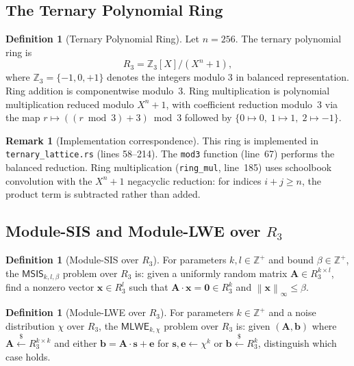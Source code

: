 \documentclass[11pt,a4paper]{article}
\theoremstyle{definition}
\newtheorem{definition}[theorem]{Definition}
\newtheorem{remark}[theorem]{Remark}
\newcommand{\Z}{\mathbb{Z}}
\newcommand{\linf}[1]{\left\lVert #1 \right\rVert_{\infty}}
\newcommand{\MSIS}{\textsf{MSIS}}
\newcommand{\MLWE}{\textsf{MLWE}}
\begin{document}
\subsection{The Ternary Polynomial Ring}

\begin{definition}[Ternary Polynomial Ring]
\label{def:ring}
Let $n = 256$. The ternary polynomial ring is
\[
  R_3 = \Z_3[X] / (X^n + 1),
\]
where $\Z_3 = \{-1, 0, +1\}$ denotes the integers modulo 3 in balanced representation. Ring addition is componentwise modulo~3. Ring multiplication is polynomial multiplication reduced modulo $X^n + 1$, with coefficient reduction modulo~3 via the map $r \mapsto ((r \bmod 3) + 3) \bmod 3$ followed by $\{0 \mapsto 0,\; 1 \mapsto 1,\; 2 \mapsto -1\}$.
\end{definition}

\begin{remark}[Implementation correspondence]
This ring is implemented in \texttt{ternary\_lattice.rs} (lines 58--214). The \texttt{mod3} function (line~67) performs the balanced reduction. Ring multiplication (\texttt{ring\_mul}, line~185) uses schoolbook convolution with the $X^n+1$ negacyclic reduction: for indices $i+j \geq n$, the product term is subtracted rather than added.
\end{remark}

\subsection{Module-SIS and Module-LWE over $R_3$}

\begin{definition}[Module-SIS over $R_3$]
\label{def:msis}
For parameters $k, l \in \Z^+$ and bound $\beta \in \Z^+$, the $\MSIS_{k,l,\beta}$ problem over $R_3$ is: given a uniformly random matrix $\mathbf{A} \in R_3^{k \times l}$, find a nonzero vector $\mathbf{x} \in R_3^l$ such that $\mathbf{A} \cdot \mathbf{x} = \mathbf{0} \in R_3^k$ and $\linf{\mathbf{x}} \leq \beta$.
\end{definition}

\begin{definition}[Module-LWE over $R_3$]
\label{def:mlwe}
For parameters $k \in \Z^+$ and a noise distribution $\chi$ over $R_3$, the $\MLWE_{k,\chi}$ problem over $R_3$ is: given $(\mathbf{A}, \mathbf{b})$ where $\mathbf{A} \xleftarrow{\$} R_3^{k \times k}$ and either $\mathbf{b} = \mathbf{A} \cdot \mathbf{s} + \mathbf{e}$ for $\mathbf{s}, \mathbf{e} \leftarrow \chi^k$ or $\mathbf{b} \xleftarrow{\$} R_3^k$, distinguish which case holds.
\end{definition}
\end{document}
